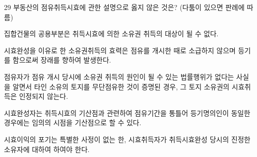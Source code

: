 \begin{question}{29}
부동산의 점유취득시효에 관한 설명으로 옳지 않은 것은? (다툼이 있으면 판례에 따름)
\begin{choices}
  \item 집합건물의 공용부분은 취득시효에 의한 소유권 취득의 대상이 될 수 없다.
  \item 시효완성을 이유로 한 소유권취득의 효력은 점유를 개시한 때로 소급하지 않으며 등기를 함으로써 장래를 향하여 발생한다.
  \item 점유자가 점유 개시 당시에 소유권 취득의 원인이 될 수 있는 법률행위가 없다는 사실을 알면서 타인 소유의 토지를 무단점유한 것이 증명된 경우, 그 토지 소유권의 시효취득은 인정되지 않는다.
  \item 시효완성자는 취득시효의 기산점과 관련하여 점유기간을 통틀어 등기명의인이 동일한 경우에는 임의의 시점을 기산점으로 할 수 있다.
  \item 시효이익의 포기는 특별한 사정이 없는 한, 시효취득자가 취득시효완성 당시의 진정한 소유자에 대하여 하여야 한다.
\end{choices}
\end{question}

